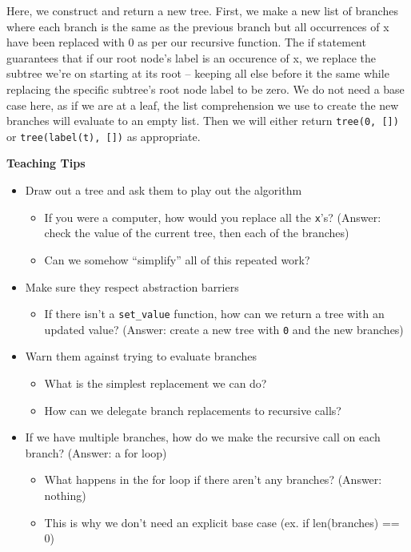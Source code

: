 \begin{blocksection}
\begin{solution}
Here, we construct and return a new tree. First, we make 
a new list of branches where each branch is the same
as the previous branch but all occurrences of x have been
replaced with 0 as per our recursive function. The if statement guarantees that if our root node's label is an occurence of x,
we replace the subtree we're on starting at its root --  
keeping all else before it the same while replacing the specific subtree's root node label to be zero.
\newline
We do not need a base case here, as if we are at a leaf, the list
comprehension we use to create the new branches will evaluate to an 
empty list. Then we will either return \lstinline$tree(0, [])$ or
\lstinline$tree(label(t), [])$ as appropriate. 
\end{solution}
\end{blocksection}


\begin{guide}
	\begin{blocksection}
	\textbf{Teaching Tips}
	\begin{itemize}
			\item Draw out a tree and ask them to play out the algorithm
			\begin{itemize}
	                \item If you were a computer, how would you replace all the \lstinline{x}'s? (Answer: check the value of the current tree, then each of the branches)
	                \item Can we somehow “simplify” all of this repeated work?
            \end{itemize}
		\item Make sure they respect abstraction barriers 
            \begin{itemize}
                \item If there isn't a \lstinline{set_value} function, how can we return a tree with an updated value? (Answer: create a new tree with \lstinline{0} and the new branches)
            \end{itemize}
		\item Warn them against trying to evaluate branches
            \begin{itemize}
                \item What is the simplest replacement we can do?
                \item How can we delegate branch replacements to recursive calls?
            \end{itemize}
            \item If we have multiple branches, how do we make the recursive call on each branch? (Answer: a for loop)
            \begin{itemize}
                \item What happens in the for loop if there aren’t any branches? (Answer: nothing)
                \item This is why we don’t need an explicit base case (ex. if len(branches) == 0)
            \end{itemize}
	\end{itemize}
	\end{blocksection}
\end{guide}

